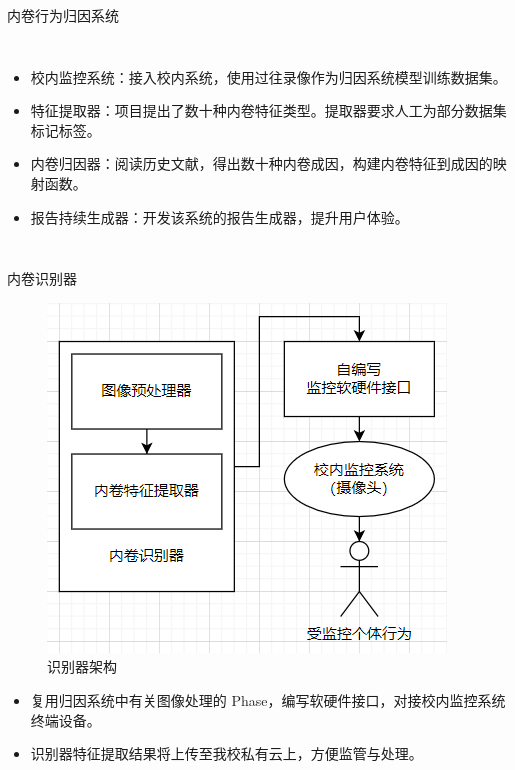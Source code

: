 \begin{frame}{内卷行为归因系统}
\begin{columns}
            \begin{itemize}
                \item 校内监控系统：接入校内系统，使用过往录像作为归因系统模型训练数据集。
                \item 特征提取器：项目提出了数十种内卷特征类型。提取器要求人工为部分数据集标记标签。
                \item 内卷归因器：阅读历史文献，得出数十种内卷成因，构建内卷特征到成因的映射函数。
                \item 报告持续生成器：开发该系统的报告生成器，提升用户体验。
            \end{itemize}
        \end{columns}
    \end{frame}

    \begin{frame}{内卷识别器}
        \begin{figure}
            \centering
            \includegraphics[width=.25\textwidth]{contents/figure/data-detector.png}
            \caption{识别器架构}
            \label{fig:data-detector}
        \end{figure}

        \begin{itemize}
            \item \small 复用归因系统中有关图像处理的 Phase，编写软硬件接口，对接校内监控系统终端设备。
            \item \small 识别器特征提取结果将上传至我校私有云上，方便监管与处理。
        \end{itemize}
    \end{frame}

